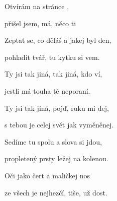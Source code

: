 

\zs
Otvírám  na stránce ,

přišel jsem,  má, něco ti 

Zeptat se, co děláš a jakej byl den,

pohladit tvář, tu kytku si vem.
\ks

\zr
Ty jsi tak jiná, tak jiná, kdo ví,

jestli má touha tě neporaní.

Ty jsi tak jiná, pojď, ruku mi dej,

s tebou je celej svět jak vyměněnej.
\kr

\zs
Sedíme tu spolu a slova si jdou,

propletený prsty ležej na kolenou.

Oči jako čert a maličkej nos

ze všech je nejhezčí, tiše, už dost.
\ks

\zr
\kr

\kp





